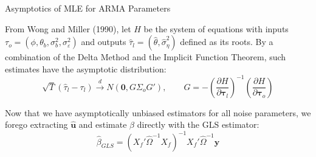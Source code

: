 \documentclass[9pt]{beamer}
\numberwithin{equation}{section}
\theoremstyle{plain}
\begin{document}
\begin{frame}{Asymptotics of MLE for ARMA Parameters}

\begin{block}{From Wong and Miller (1990), let $H$ be the system of equations with inputs $\tau_o = (\phi, \theta_b, \sigma_b^2, \sigma_\varepsilon^2)$ and outputs $\hat{\tau}_l = (\hat{\theta}, \hat{\sigma}_\eta^2)$ defined as its roots. By a combination of the Delta Method and the Implicit Function Theorem, such estimates have the asymptotic distribution:}
    \centering
    $$\sqrt{T}(\hat{\tau}_l - \tau_l) \xrightarrow{d} N(\mathbf{0},G\Sigma_oG'), \qquad G = -\left(\frac{\partial H}{\partial \bm{\tau}_l}\right)^{-1}
  \left(\frac{\partial H}{\partial \bm{\tau}_o}\right)$$
\end{block}
\begin{block}{Now that we have asymptotically unbiased estimators for all noise parameters, we forego extracting $\hat{\mathbf{u}}$ and estimate $\beta$ directly with the GLS estimator:}
\centering
$$ \hat{\beta}_{GLS} = (X_f'\hat{\Omega}^{-1}X_f)^{-1}X_f'\hat{\Omega}^{-1}\mathbf{y} $$
\end{block}
\end{frame}




%         


\end{document}
